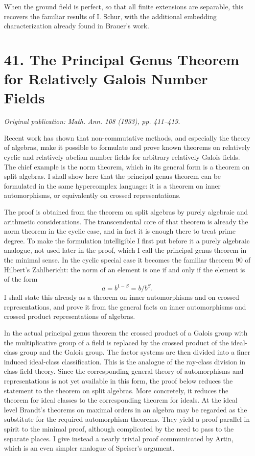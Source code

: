 \documentclass[11pt]{article}
\begin{document}
When the ground field is perfect, so that all finite extensions are
separable, this recovers the familiar results of I. Schur, with the
additional embedding characterization already found in Brauer's work.

\clearpage
\section{41. The Principal Genus Theorem for Relatively Galois Number Fields}

\textit{Original publication: Math. Ann. 108 (1933), pp. 411--419.}

Recent work has shown that non-commutative methods, and especially the theory of algebras, make it possible to formulate and prove known theorems on relatively cyclic and relatively abelian number fields for arbitrary relatively Galois fields. The chief example is the norm theorem, which in its general form is a theorem on split algebras. I shall show here that the principal genus theorem can be formulated in the same hypercomplex language: it is a theorem on inner automorphisms, or equivalently on crossed representations.

The proof is obtained from the theorem on split algebras by purely algebraic and arithmetic considerations. The transcendental core of that theorem is already the norm theorem in the cyclic case, and in fact it is enough there to treat prime degree. To make the formulation intelligible I first put before it a purely algebraic analogue, not used later in the proof, which I call the principal genus theorem in the minimal sense. In the cyclic special case it becomes the familiar theorem 90 of Hilbert's Zahlbericht: the norm of an element is one if and only if the element is of the form
\[
  a=b^{1-S}=b/b^S .
\]
I shall state this already as a theorem on inner automorphisms and on crossed representations, and prove it from the general facts on inner automorphisms and crossed product representations of algebras.

In the actual principal genus theorem the crossed product of a Galois group with the multiplicative group of a field is replaced by the crossed product of the ideal-class group and the Galois group. The factor systems are then divided into a finer induced ideal-class classification. This is the analogue of the ray-class division in class-field theory. Since the corresponding general theory of automorphisms and representations is not yet available in this form, the proof below reduces the statement to the theorem on split algebras. More concretely, it reduces the theorem for ideal classes to the corresponding theorem for ideals. At the ideal level Brandt's theorems on maximal orders in an algebra may be regarded as the substitute for the required automorphism theorems. They yield a proof parallel in spirit to the minimal proof, although complicated by the need to pass to the separate places. I give instead a nearly trivial proof communicated by Artin, which is an even simpler analogue of Speiser's argument.
\end{document}
